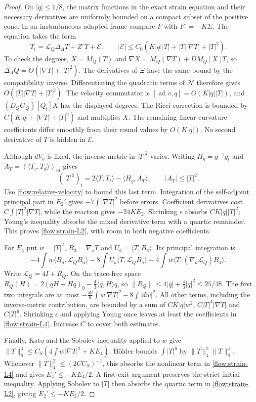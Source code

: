 \documentclass[11pt]{article}
\numberwithin{equation}{section}
\theoremstyle{definition}
\theoremstyle{remark}
\begin{document}
\begin{proof}
On $|q|\leq1/8$, the matrix functions in the exact strain equation
and their necessary derivatives are uniformly bounded on a compact
subset of the positive cone. In an instantaneous adapted frame compare
$F$ with $F^\circ=-K\Sigma$. The equation takes the form
\[
 T_t=\mathscr L_Q\Delta_AT+Z^\circ T+\mathcal E,\qquad
 |\mathcal E|\leq C_0(K|q||T|+|T||\nabla T|+|T|^3).
\]
To check the degrees, $X=M_Q(T)$ and
$\nabla X=M_Q(\nabla T)+DM_Q[X]T$, so
$\Delta_AQ=O(|\nabla T|+|T|^2)$. The derivatives of $\Xi$ have the
same bound by the compatibility inverse. Differentiating the quadratic
terms of $\mathcal N$ therefore gives
$O(|T||\nabla T|+|T|^3)$. The velocity commutator is
$[\operatorname{ad}v,q]=O(K|q||T|)$, and
$(D_QG_Q)[Q_t]X$ has the displayed degrees.
The Ricci correction is bounded by
$C(K|q|+|\nabla T|+|T|^2)$ and multiplies $X$.
The remaining linear curvature coefficients differ smoothly from their
round values by $O(K|q|)$. No second derivative of $T$ is hidden in
$\mathcal E$.

Although $dV_g$ is fixed, the inverse metric in $|T|^2$ varies.
Writing $H_g=g^{-1}g_t$ and
$A_T=(\langle T_c,T_d\rangle)_{cd}$ gives
\[
 (|T|^2)_t=2\langle T,T_t\rangle-\langle H_g,A_T\rangle,
 \qquad |A_T|\leq|T|^2.
\]
Use \eqref{flow:relative-velocity} to bound this last term. Integration
of the self-adjoint principal part in $E_2'$ gives
$-7\int|\nabla T|^2$ before errors. Coefficient derivatives cost
$C\int|T|^2|\nabla T|$, while the reaction gives $-24KE_2$.
Shrinking $\epsilon$ absorbs $CK|q||T|^2$; Young's inequality absorbs
the mixed derivative term with a quartic remainder. This proves
\eqref{flow:strain-L2}, with room in both negative coefficients.

For $E_4$ put $w=|T|^2$, $B_a=\nabla_aT$ and $U_a=\langle T,B_a\rangle$.
Its principal integration is
\[
 -4\int w\langle B_a,\mathscr L_QB_a\rangle
 -8\int U_a\langle T,\mathscr L_QB_a\rangle
 -4\int w\langle T,(\nabla_a\mathscr L_Q)B_a\rangle.
\]
Write $\mathscr L_Q=4I+R_Q$. On the trace-free space
$R_Q(H)=2(qH+Hq)_0-\tfrac43\langle q,H\rangle q$, so
$\|R_Q\|\leq4|q|+\tfrac43|q|^2\leq25/48$.
The first two integrals are at most
$-\tfrac{59}{6}\int w|\nabla T|^2-8\int|dw|^2$.
All other terms, including the inverse-metric contribution, are bounded
by a sum of $CK|q|w^2$, $C|T|^4|\nabla T|$ and $C|T|^6$.
Shrinking $\epsilon$ and applying Young once leaves at least the
coefficients in \eqref{flow:strain-L4}. Increase $C$ to cover both estimates.

Finally, Kato and the Sobolev inequality applied to $w$ give
$\|T\|_8^4\leq C_S(4\int w|\nabla T|^2+KE_4)$.
H\"older bounds $\int|T|^6$ by $\|T\|_4^2\|T\|_8^4$.
Whenever $\|T\|_4^2\leq(2CC_S)^{-1}$, this absorbs the nonlinear
term in \eqref{flow:strain-L4} and gives $E_4'\leq-KE_4/2$.
A first-exit argument preserves the strict initial inequality.
Applying Sobolev to $|T|$ then absorbs the quartic term in
\eqref{flow:strain-L2}, giving $E_2'\leq-KE_2/2$.
\end{proof}
\end{document}
